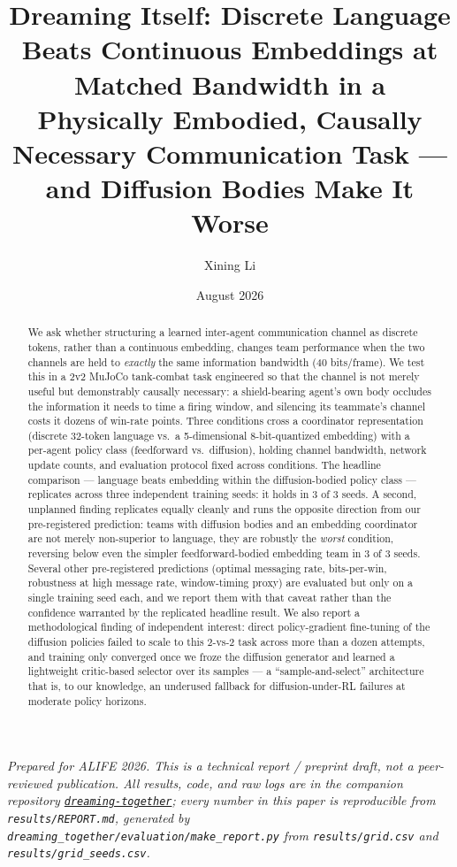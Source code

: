 \documentclass[11pt]{article}
\title{\bfseries Dreaming Itself: Discrete Language Beats Continuous Embeddings at
Matched Bandwidth in a Physically Embodied, Causally Necessary
Communication Task --- and Diffusion Bodies Make It Worse}
\author{Xining Li}
\date{August 2026}
\begin{document}
\maketitle

\begin{center}
\begin{minipage}{0.9\textwidth}
\small\itshape
Prepared for ALIFE 2026. This is a technical report / preprint draft, not
a peer-reviewed publication. All results, code, and raw logs are in the
companion repository
\href{https://github.com/xiningli/dreaming-together}{\texttt{dreaming-together}};
every number in this paper is reproducible from
\texttt{results/REPORT.md}, generated by
\texttt{dreaming\_together/evaluation/make\_report.py} from
\texttt{results/grid.csv} and \texttt{results/grid\_seeds.csv}.
\end{minipage}
\end{center}

\begin{abstract}
\noindent
We ask whether structuring a learned inter-agent communication channel as
discrete tokens, rather than a continuous embedding, changes team
performance when the two channels are held to \emph{exactly} the same
information bandwidth (40 bits/frame). We test this in a 2v2 MuJoCo
tank-combat task engineered so that the channel is not merely useful but
demonstrably causally necessary: a shield-bearing agent's own body
occludes the information it needs to time a firing window, and silencing
its teammate's channel costs it dozens of win-rate points. Three
conditions cross a coordinator representation (discrete 32-token
language vs.\ a 5-dimensional 8-bit-quantized embedding) with a
per-agent policy class (feedforward vs.\ diffusion), holding channel
bandwidth, network update counts, and evaluation protocol fixed across
conditions. The headline comparison --- language beats embedding within
the diffusion-bodied policy class --- replicates across three independent
training seeds: it holds in 3 of 3 seeds. A second, unplanned finding
replicates equally cleanly and runs the opposite direction from our
pre-registered prediction: teams with diffusion bodies and an embedding
coordinator are not merely non-superior to language, they are robustly
the \emph{worst} condition, reversing below even the simpler
feedforward-bodied embedding team in 3 of 3 seeds. Several other
pre-registered predictions (optimal messaging rate, bits-per-win,
robustness at high message rate, window-timing proxy) are evaluated but
only on a single training seed each, and we report them with that
caveat rather than the confidence warranted by the replicated headline
result. We also report a methodological finding of independent
interest: direct policy-gradient fine-tuning of the diffusion policies
failed to scale to this 2-vs-2 task across more than a dozen attempts,
and training only converged once we froze the diffusion generator and
learned a lightweight critic-based selector over its samples --- a
``sample-and-select'' architecture that is, to our knowledge, an
underused fallback for diffusion-under-RL failures at moderate policy
horizons.
\end{abstract}
\end{document}
